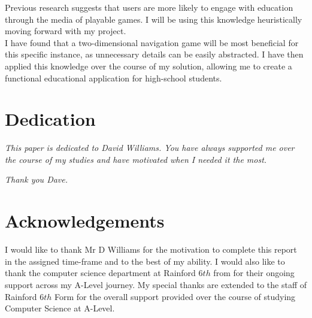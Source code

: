 \documentclass[12pt]{report}
\begin{document}
Previous research suggests that users are more likely to engage with education through the media of playable games. I will be using this knowledge heuristically moving forward with my project.\\

I have found that a two-dimensional navigation game will be most beneficial for this specific instance, as unnecessary details can be easily abstracted. I have then applied this knowledge over the course of my solution, allowing me to create a functional educational application for high-school students.


\chapter*{Dedication}
\textit{This paper is dedicated to David Williams. You have always supported me over the course of my studies and have motivated when I needed it the most.   }

\vfill

\textit{Thank you Dave.}

\vfill

\pagebreak

\chapter*{Acknowledgements}
\begin{center}
I would like to thank Mr D Williams for the motivation to complete this report in the assigned time-frame and to the best of my ability. I would also like to thank the computer science department at Rainford 6$th$ from for their ongoing support across my A-Level journey. My special thanks are extended to the staff of Rainford 6$th$ Form for the overall support provided over the course of studying Computer Science at A-Level.
\end{center}

\vfill
\pagebreak

\setcounter{tocdepth}{3}
\tableofcontents


\pagebreak

\listoffigures


\pagebreak

\listoftables
\end{document}
